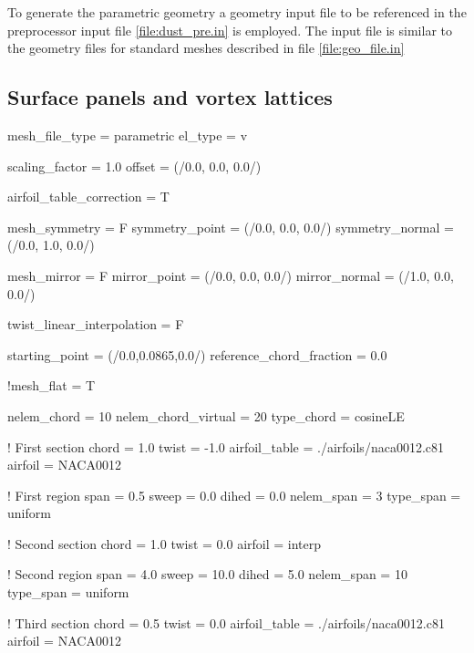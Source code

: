 To generate the parametric geometry a geometry input file to be referenced in the preprocessor input file 
\ref{file:dust_pre.in} is employed. The input file is similar to the geometry files for standard meshes described 
in file \ref{file:geo_file.in}


\subsection{Surface panels and vortex lattices}

\begin{inputfile}[frame=single, caption={paramtetric\_geo\_file.in}, label={file:parametric_geo_file.in}]
mesh_file_type = parametric
el_type = v

scaling_factor = 1.0
offset = (/0.0, 0.0, 0.0/)

airfoil_table_correction = T

mesh_symmetry = F
symmetry_point  = (/0.0, 0.0, 0.0/)
symmetry_normal = (/0.0, 1.0, 0.0/)

mesh_mirror = F
mirror_point  = (/0.0, 0.0, 0.0/)
mirror_normal = (/1.0, 0.0, 0.0/)

twist_linear_interpolation = F

starting_point = (/0.0,0.0865,0.0/)
reference_chord_fraction = 0.0

!mesh_flat = T

nelem_chord = 10
nelem_chord_virtual = 20
type_chord = cosineLE

! First section
chord = 1.0
twist = -1.0
airfoil_table = ./airfoils/naca0012.c81
airfoil = NACA0012

! First region
span = 0.5
sweep = 0.0
dihed = 0.0
nelem_span = 3 
type_span = uniform

! Second section
chord = 1.0
twist = 0.0
airfoil = interp

! Second region
span = 4.0
sweep = 10.0
dihed = 5.0
nelem_span = 10 
type_span = uniform

! Third section
chord = 0.5
twist =  0.0
airfoil_table = ./airfoils/naca0012.c81
airfoil = NACA0012

\end{inputfile}

